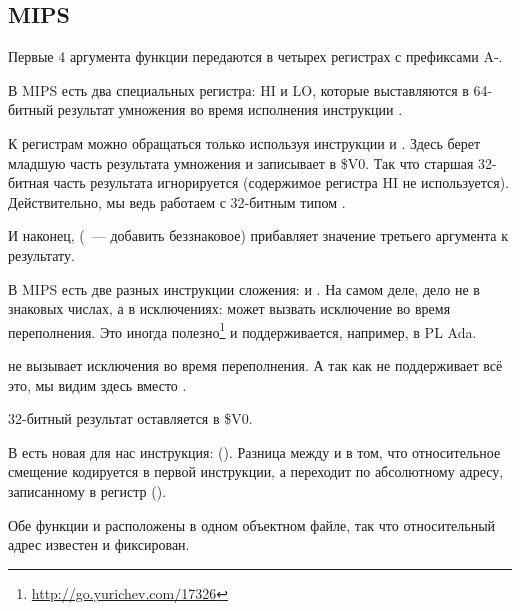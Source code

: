 \subsection{MIPS}



Первые 4 аргумента функции передаются в четырех регистрах с префиксами A-.

В MIPS есть два специальных регистра: HI и LO, которые выставляются в 64-битный результат умножения
во время исполнения инструкции .

К регистрам можно обращаться только используя инструкции  и .
Здесь  берет младшую часть результата умножения и записывает в \$V0.
Так что старшая 32-битная часть результата игнорируется (содержимое регистра HI не используется).
Действительно, мы ведь работаем с 32-битным типом \Tint.


И наконец,  (~--- добавить беззнаковое) прибавляет значение третьего аргумента к результату.

В MIPS есть две разных инструкции сложения:  и .
На самом деле, дело не в знаковых числах, а в исключениях:  может вызвать исключение
во время переполнения. Это иногда полезно\footnote{\url{http://go.yurichev.com/17326}} и поддерживается,
например, в \ac{PL} Ada.

 не вызывает исключения во время переполнения.
А так как \CCpp не поддерживает всё это, мы видим здесь  вместо .

32-битный результат оставляется в \$V0.

В \main есть новая для нас инструкция:  (). 
Разница между  и  в том, что относительное смещение кодируется в первой инструкции,
а  переходит по абсолютному адресу, записанному в регистр ().

Обе функции \ttf и \main расположены в одном объектном файле, так что относительный адрес \ttf известен и фиксирован.

